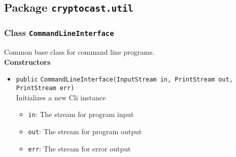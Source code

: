 \subsection{Package \lstinline!cryptocast.util!}
\subsubsection{Class \lstinline|CommandLineInterface|}
Common base class for command line programs. \\




\textbf{Constructors}
\begin{itemize}
\item \lstinline|public| \lstinline|CommandLineInterface|\lstinline|(InputStream in, PrintStream out, PrintStream err)|\\
Initializes a new Cli instance
\begin{itemize}
\item \lstinline|in|: The stream for program input
\item \lstinline|out|: The stream for program output
\item \lstinline|err|: The stream for error output
\end{itemize}



\end{itemize}


